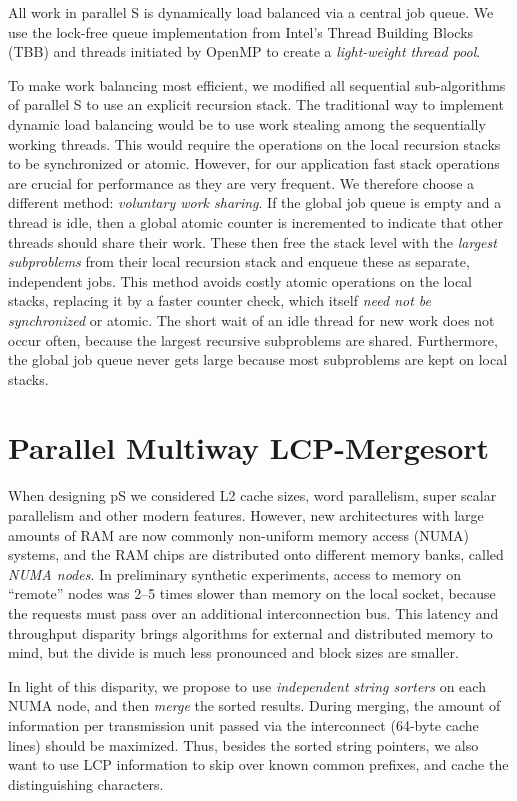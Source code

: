 \documentclass[a4paper]{myjournal}
\begin{document}
All work in parallel S is dynamically load balanced via a central job
queue. We use the lock-free queue implementation from Intel's Thread Building
Blocks (TBB) and threads initiated by OpenMP to create a \emph{light-weight
  thread pool}.

To make work balancing most efficient, we modified all sequential
sub-al\-go\-rithms of parallel S to use an explicit recursion stack. The
traditional way to implement dynamic load balancing would be to use work
stealing among the sequentially working threads. This would require the
operations on the local recursion stacks to be synchronized or atomic. However,
for our application fast stack operations are crucial for performance as they
are very frequent. We therefore choose a different method: \emph{voluntary work
  sharing}. If the global job queue is empty and a thread is idle, then a global
atomic counter is incremented to indicate that other threads should share their
work. These then free the stack level with the \emph{largest subproblems} from
their local recursion stack and enqueue these as separate, independent
jobs. This method avoids costly atomic operations on the local stacks, replacing
it by a faster counter check, which itself \emph{need not be synchronized} or
atomic. The short wait of an idle thread for new work does not occur often,
because the largest recursive subproblems are shared. Furthermore, the global
job queue never gets large because most subproblems are kept on local stacks.

\section{Parallel Multiway LCP-Mergesort}\label{sec:para-mergesort}

When designing pS we considered L2 cache sizes, word parallelism, super
scalar parallelism and other modern features. However, new architectures with
large amounts of RAM are now commonly non-uniform memory access (NUMA) systems,
and the RAM chips are distributed onto different memory banks, called \emph{NUMA
  nodes}. In preliminary synthetic experiments, access to memory on ``remote''
nodes was 2--5 times slower than memory on the local socket, because the
requests must pass over an additional interconnection bus. This latency and
throughput disparity brings algorithms for external and distributed memory to
mind, but the divide is much less pronounced and block sizes are smaller.

In light of this disparity, we propose to use \emph{independent string sorters}
on each NUMA node, and then \emph{merge} the sorted results. During merging, the
amount of information per transmission unit passed via the interconnect (64-byte
cache lines) should be maximized. Thus, besides the sorted string pointers, we
also want to use LCP information to skip over known common prefixes, and cache
the distinguishing characters.
\end{document}
